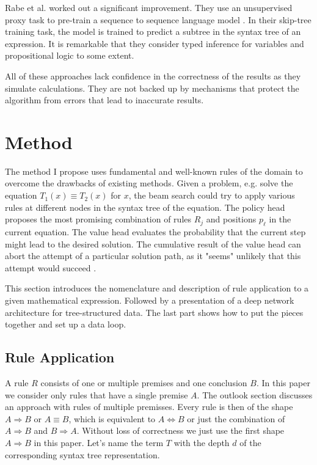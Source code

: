 \documentclass{scrartcl}
\theoremstyle{definition}
\begin{document}
Rabe et al. worked out a significant improvement. They use an unsupervised proxy task to pre-train a sequence to sequence language model \cite{rabe2020mathematical}.
In their skip-tree training task, the model is trained to predict a subtree in the syntax tree of an expression.
It is remarkable that they consider typed inference for variables and propositional logic to some extent.

All of these approaches lack confidence in the correctness of the results as they simulate calculations.
They are not backed up by mechanisms that protect the algorithm from errors that lead to inaccurate results.

\section{Method}

The method I propose uses fundamental and well-known rules of the domain to overcome the drawbacks of existing methods.
Given a problem, e.g. solve the equation $T_1\left(x\right)\equiv T_2\left(x\right)$ for $x$,
the beam search could try to apply various rules at different nodes in the syntax tree of the equation.
The policy head proposes the most promising combination of rules $R_j$ and positions $p_\ell$ in the current equation.
The value head evaluates the probability that the current step might lead to the desired solution.
The cumulative result of the value head can abort the attempt of a particular solution path, as it "seems" unlikely that this attempt would succeed \cite{44806}.

This section introduces the nomenclature and description of rule application to a given mathematical expression.
Followed by a presentation of a deep network architecture for tree-structured data.
The last part shows how to put the pieces together and set up a data loop.

\subsection{Rule Application}

A rule $R$ consists of one or multiple premises and one conclusion $B$.
In this paper we consider only rules that have a single premise $A$.
The outlook section discusses an approach with rules of multiple premisses. 
Every rule is then of the shape $A \Longrightarrow B$ or $A \equiv B$, which is equivalent to $A \Longleftrightarrow B$ or just the combination of $A \Longrightarrow B$ and $B \Longrightarrow A$.
Without loss of correctness we just use the first shape $A \Longrightarrow B$ in this paper.
Let's name the term $T$ with the depth $d$ of the corresponding syntax tree representation.
\end{document}
